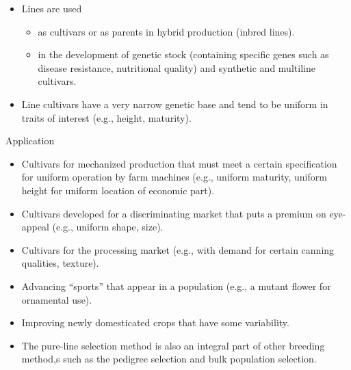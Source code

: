 \documentclass[11pt,dvipsnames,ignorenonframetext,aspectratio=169]{beamer}
\providecommand{\tightlist}{%
  \setlength{\itemsep}{0pt}\setlength{\parskip}{0pt}}
\begin{document}
\begin{frame}{}
\protect\hypertarget{section-2}{}

\begin{itemize}
\tightlist
\item
  Lines are used

  \begin{itemize}
  \tightlist
  \item
    as cultivars or as parents in hybrid production (inbred lines).
  \item
    in the development of genetic stock (containing specific genes such
    as disease resistance, nutritional quality) and synthetic and
    multiline cultivars.
  \end{itemize}
\item
  Line cultivars have a very narrow genetic base and tend to be uniform
  in traits of interest (e.g., height, maturity).
\end{itemize}

\end{frame}

\begin{frame}{Application}
\protect\hypertarget{application}{}

\begin{itemize}
\tightlist
\item
  Cultivars for mechanized production that must meet a certain
  specification for uniform operation by farm machines (e.g., uniform
  maturity, uniform height for uniform location of economic part).
\item
  Cultivars developed for a discriminating market that puts a premium on
  eye-appeal (e.g., uniform shape, size).
\item
  Cultivars for the processing market (e.g., with demand for certain
  canning qualities, texture).
\item
  Advancing ``sports'' that appear in a population (e.g., a mutant
  flower for ornamental use).
\item
  Improving newly domesticated crops that have some variability.
\item
  The pure-line selection method is also an integral part of other
  breeding method,s such as the pedigree selection and bulk population
  selection.
\end{itemize}

\end{frame}
\end{document}
